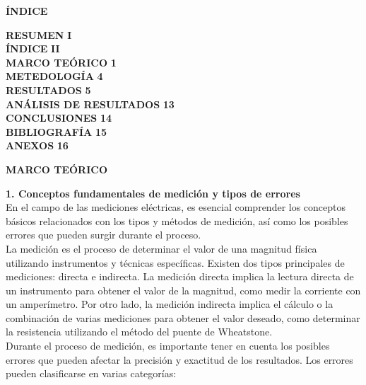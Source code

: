\documentclass[12pt]{article}
\begin{document}
	\newpage
	
	\begin{center}
		\textbf{\large ÍNDICE}\\
	\end{center}
	
	\noindent \textbf{RESUMEN} \hfill \textbf{I}\\
	\noindent \textbf{ÍNDICE} \hfill \textbf{II}\\
	\noindent \textbf{MARCO TEÓRICO} \hfill \textbf{1}\\
	\noindent \textbf{METEDOLOGÍA} \hfill \textbf{4}\\
	\noindent \textbf{RESULTADOS} \hfill \textbf{5}\\
	\noindent \textbf{ANÁLISIS DE RESULTADOS} \hfill \textbf{13}\\
	\noindent \textbf{CONCLUSIONES} \hfill \textbf{14}\\
	\noindent \textbf{BIBLIOGRAFÍA} \hfill \textbf{15}\\
	\noindent \textbf{ANEXOS} \hfill \textbf{16}\\
	
	\newpage
	
	
	\begin{center}
		\textbf{\large MARCO TEÓRICO}\\
	\end{center}
	
	\textbf{1. Conceptos fundamentales de medición y tipos de errores}\\
	
	En el campo de las mediciones eléctricas, es esencial comprender los conceptos básicos relacionados con los tipos y métodos de medición, así como los posibles errores que pueden surgir durante el proceso.\\
	
	La medición es el proceso de determinar el valor de una magnitud física utilizando instrumentos y técnicas específicas. Existen dos tipos principales de mediciones: directa e indirecta. La medición directa implica la lectura directa de un instrumento para obtener el valor de la magnitud, como medir la corriente con un amperímetro. Por otro lado, la medición indirecta implica el cálculo o la combinación de varias mediciones para obtener el valor deseado, como determinar la resistencia utilizando el método del puente de Wheatstone.\\
	
	Durante el proceso de medición, es importante tener en cuenta los posibles errores que pueden afectar la precisión y exactitud de los resultados. Los errores pueden clasificarse en varias categorías:\\
	
\end{document}
